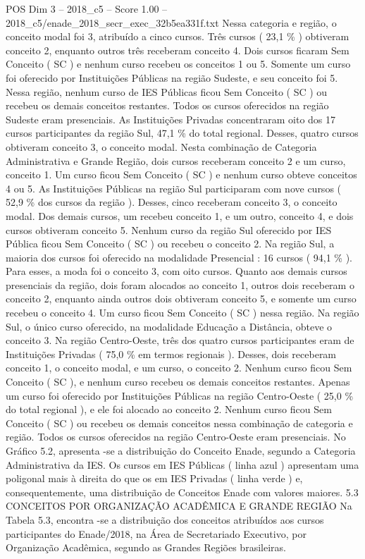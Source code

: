 \begin{textsample}{POS Dim 3 – 2018\_c5 – Score 1.00 – 2018\_c5/enade\_2018\_secr\_exec\_32b5ea331f.txt}
Nessa categoria e região, o conceito modal foi 3, atribuído a cinco cursos.
Três cursos ( 23,1 \% ) obtiveram conceito 2, enquanto outros três receberam conceito 4.
Dois cursos ficaram Sem Conceito ( SC ) e nenhum curso recebeu os conceitos 1 ou 5.
Somente um curso foi oferecido por Instituições Públicas na região Sudeste, e seu conceito foi 5.
Nessa região, nenhum curso de IES Públicas ficou Sem Conceito ( SC ) ou recebeu os demais conceitos restantes.
Todos os cursos oferecidos na região Sudeste eram presenciais.
As Instituições Privadas concentraram oito dos 17 cursos participantes da região Sul, 47,1 \% do total regional.
Desses, quatro cursos obtiveram conceito 3, o conceito modal.
Nesta combinação de Categoria Administrativa e Grande Região, dois cursos receberam conceito 2 e um curso, conceito 1.
Um curso ficou Sem Conceito ( SC ) e nenhum curso obteve conceitos 4 ou 5.
As Instituições Públicas na região Sul participaram com nove cursos ( 52,9 \% dos cursos da região ).
Desses, cinco receberam conceito 3, o conceito modal.
Dos demais cursos, um recebeu conceito 1, e um outro, conceito 4, e dois cursos obtiveram conceito 5.
Nenhum curso da região Sul oferecido por IES Pública ficou Sem Conceito ( SC ) ou recebeu o conceito 2.
Na região Sul, a maioria dos cursos foi oferecido na modalidade Presencial : 16 cursos ( 94,1 \% ).
Para esses, a moda foi o conceito 3, com oito cursos.
Quanto aos demais cursos presenciais da região, dois foram alocados ao conceito 1, outros dois receberam o conceito 2, enquanto ainda outros dois obtiveram conceito 5, e somente um curso recebeu o conceito 4.
Um curso ficou Sem Conceito ( SC ) nessa região.
Na região Sul, o único curso oferecido, na modalidade Educação a Distância, obteve o conceito 3.
Na região Centro-Oeste, três dos quatro cursos participantes eram de Instituições Privadas ( 75,0 \% em termos regionais ).
Desses, dois receberam conceito 1, o conceito modal, e um curso, o conceito 2.
Nenhum curso ficou Sem Conceito ( SC ), e nenhum curso recebeu os demais conceitos restantes.
Apenas um curso foi oferecido por Instituições Públicas na região Centro-Oeste ( 25,0 \% do total regional ), e ele foi alocado ao conceito 2.
Nenhum curso ficou Sem Conceito ( SC ) ou recebeu os demais conceitos nessa combinação de categoria e região.
Todos os cursos oferecidos na região Centro-Oeste eram presenciais.
No Gráfico 5.2, apresenta -se a distribuição do Conceito Enade, segundo a Categoria Administrativa da IES.
Os cursos em IES Públicas ( linha azul ) apresentam uma poligonal mais à direita do que os em IES Privadas ( linha verde ) e, consequentemente, uma distribuição de Conceitos Enade com valores maiores. 5.3 CONCEITOS POR ORGANIZAÇÃO ACADÊMICA E GRANDE REGIÃO Na Tabela 5.3, encontra -se a distribuição dos conceitos atribuídos aos cursos participantes do Enade/2018, na Área de Secretariado Executivo, por Organização Acadêmica, segundo as Grandes Regiões brasileiras.

\end{textsample}
